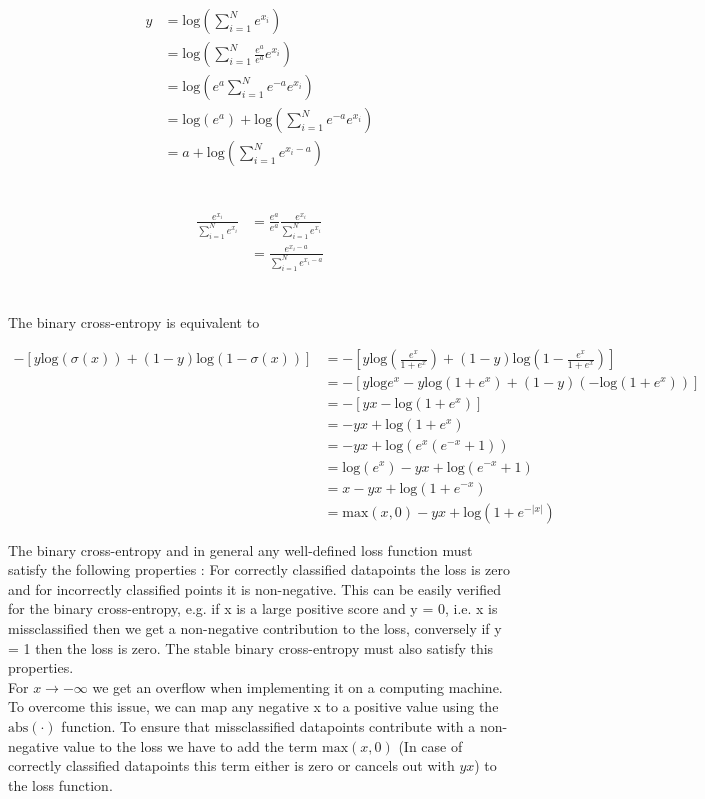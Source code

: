 \documentclass[11pt]{article}
\newcommand{\exercise}{\section{}}
\newcommand{\sumf}[3]{\sum_{#1}^{#2} #3}
\begin{document}
\exercise

\begin{align*}
y &= \text{log}(\sumf{i=1}{N}{ e^{x_i} }) \\
&= \text{log}(\sumf{i=1}{N}{ \frac{e^a}{e^a} e^{x_i} }) \\
&= \text{log}(e^a \sumf{i=1}{N}{e^{-a} e^{x_i} }) \\
&= \text{log}(e^a) + \text{log}(\sumf{i=1}{N}{e^{-a} e^{x_i} }) \\
&= a + \text{log}(\sumf{i=1}{N}{e^{x_i - a} })
\end{align*}

\exercise

\begin{align*}
\frac{e^{x_i}}{\sumf{i=1}{N}{e^{x_i}}} &= \frac{e^{a}}{e^{a}} \frac{e^{x_i}}{\sumf{i=1}{N}{e^{x_i}}} \\
&= \frac{e^{x_i - a}}{\sumf{i=1}{N}{e^{x_i - a}}}
\end{align*}

\exercise

\noindent The binary cross-entropy is equivalent to

\begin{align*}
-[y \text{log}(\sigma(x)) + (1 - y) \text{log}(1 - \sigma(x)) ] &= -[y \text{log}(\frac{e^x}{1 + e^x}) + (1 - y) \text{log}(1 - \frac{e^x}{1 + e^x}) ] \\
&= -[ y \text{log}e^x -y \text{log}(1 + e^x) + (1 - y)( -\text{log}(1 + e^x ))] \\
&= -[yx - \text{log}(1 + e^x )] \\
&= -yx + \text{log}(1 + e^x ) \\
&= -yx + \text{log}(e^x(e^{-x} + 1 )) \\
&= \text{log}(e^x) -yx +  \text{log}(e^{-x} + 1 ) \\
&= x -yx + \text{log}( 1 + e^{-x} ) \\
&= \text{max}(x,0) -yx + \text{log}( 1 + e^{-|x|} ) \tag{see below}
\end{align*}

\noindent The binary cross-entropy and in general any well-defined loss function must satisfy the following properties : For correctly classified datapoints the loss is zero and for incorrectly classified points it is non-negative. This can be easily verified for the binary cross-entropy, e.g. if x is a large positive score and y = 0, i.e. x is missclassified then we get a non-negative contribution to the loss, conversely if y = 1 then the loss is zero. The stable binary cross-entropy must also satisfy this properties.
\\
\noindent For $x \rightarrow -\infty$ we get an overflow  when implementing it on a computing machine. To overcome this issue, we can map any negative x to a positive value using the $\text{abs}(\cdot)$ function. To ensure that missclassified datapoints contribute with a non-negative value to the loss we have to add the term $\text{max}(x, 0)$ (In case of correctly classified datapoints this term either is zero or cancels out with $yx$) to the loss function.
\end{document}

